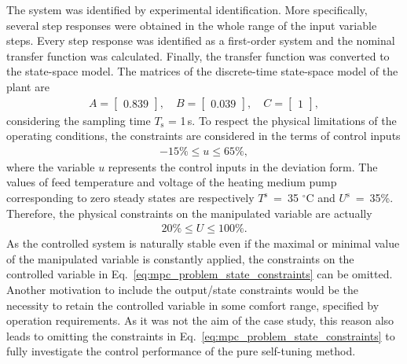 \documentclass[preprint,12pt]{elsarticle}
\begin{document}
	The system was identified by experimental identification. More specifically, several step responses were obtained in the whole range of the input variable steps. Every step response was identified as a first-order system and the nominal transfer function was calculated. Finally, the transfer function was converted to the state-space model. The matrices of the discrete-time state-space model of the plant are
	\begin{subequations}
		\label{eq:model_A_B} 
		\begin{eqnarray}
			A = \begin{bmatrix}
				0.839
			\end{bmatrix}, \quad
			B = \begin{bmatrix}
				0.039
			\end{bmatrix}, \quad
			C = \begin{bmatrix}
				1
			\end{bmatrix}, 
		\end{eqnarray}
	\end{subequations}
	considering the sampling time $T_\mathrm{s}$ = 1\,s. 
	To respect the physical limitations of the operating conditions, the constraints are considered in the terms of control inputs
	\begin{eqnarray}
		\label{eq:u_const}
		-15\% \le u \le 65\%,
	\end{eqnarray}
	where the variable $u$ represents the control inputs in the deviation form. The values of feed temperature and voltage of the heating medium pump corresponding to zero steady states are respectively $T^\mathrm{s}$~=~35 $^{\circ}\mathrm{C}$ and $U^\mathrm{s}$~=~35\%. Therefore, the physical constraints on the manipulated variable are actually
	\begin{eqnarray}
		\label{eq:U_const}
		20\% \le U \le 100\%.
	\end{eqnarray}	
	As the controlled system is naturally stable even if the maximal or minimal value of the manipulated variable is constantly applied, the constraints on the controlled variable in Eq.~\eqref{eq:mpc_problem_state_constraints} can be omitted. Another motivation to include the output/state constraints would be the necessity to retain the controlled variable in some comfort range, specified by operation requirements. As it was not the aim of the case study, this reason also leads to omitting the constraints in Eq.~\eqref{eq:mpc_problem_state_constraints} to fully investigate the control performance of the pure self-tuning method.		 
	
\end{document}
